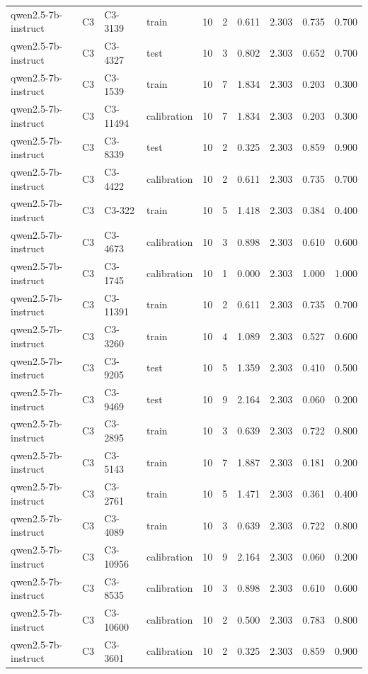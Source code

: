 \begin{table}
\begin{tabular}{llllrrrrrr}
qwen2.5-7b-instruct & C3 & C3-3139 & train & 10 & 2 & 0.611 & 2.303 & 0.735 & 0.700 \\
qwen2.5-7b-instruct & C3 & C3-4327 & test & 10 & 3 & 0.802 & 2.303 & 0.652 & 0.700 \\
qwen2.5-7b-instruct & C3 & C3-1539 & train & 10 & 7 & 1.834 & 2.303 & 0.203 & 0.300 \\
qwen2.5-7b-instruct & C3 & C3-11494 & calibration & 10 & 7 & 1.834 & 2.303 & 0.203 & 0.300 \\
qwen2.5-7b-instruct & C3 & C3-8339 & test & 10 & 2 & 0.325 & 2.303 & 0.859 & 0.900 \\
qwen2.5-7b-instruct & C3 & C3-4422 & calibration & 10 & 2 & 0.611 & 2.303 & 0.735 & 0.700 \\
qwen2.5-7b-instruct & C3 & C3-322 & train & 10 & 5 & 1.418 & 2.303 & 0.384 & 0.400 \\
qwen2.5-7b-instruct & C3 & C3-4673 & calibration & 10 & 3 & 0.898 & 2.303 & 0.610 & 0.600 \\
qwen2.5-7b-instruct & C3 & C3-1745 & calibration & 10 & 1 & 0.000 & 2.303 & 1.000 & 1.000 \\
qwen2.5-7b-instruct & C3 & C3-11391 & train & 10 & 2 & 0.611 & 2.303 & 0.735 & 0.700 \\
qwen2.5-7b-instruct & C3 & C3-3260 & train & 10 & 4 & 1.089 & 2.303 & 0.527 & 0.600 \\
qwen2.5-7b-instruct & C3 & C3-9205 & test & 10 & 5 & 1.359 & 2.303 & 0.410 & 0.500 \\
qwen2.5-7b-instruct & C3 & C3-9469 & test & 10 & 9 & 2.164 & 2.303 & 0.060 & 0.200 \\
qwen2.5-7b-instruct & C3 & C3-2895 & train & 10 & 3 & 0.639 & 2.303 & 0.722 & 0.800 \\
qwen2.5-7b-instruct & C3 & C3-5143 & train & 10 & 7 & 1.887 & 2.303 & 0.181 & 0.200 \\
qwen2.5-7b-instruct & C3 & C3-2761 & train & 10 & 5 & 1.471 & 2.303 & 0.361 & 0.400 \\
qwen2.5-7b-instruct & C3 & C3-4089 & train & 10 & 3 & 0.639 & 2.303 & 0.722 & 0.800 \\
qwen2.5-7b-instruct & C3 & C3-10956 & calibration & 10 & 9 & 2.164 & 2.303 & 0.060 & 0.200 \\
qwen2.5-7b-instruct & C3 & C3-8535 & calibration & 10 & 3 & 0.898 & 2.303 & 0.610 & 0.600 \\
qwen2.5-7b-instruct & C3 & C3-10600 & calibration & 10 & 2 & 0.500 & 2.303 & 0.783 & 0.800 \\
qwen2.5-7b-instruct & C3 & C3-3601 & calibration & 10 & 2 & 0.325 & 2.303 & 0.859 & 0.900 \\

\end{tabular}
\end{table}
